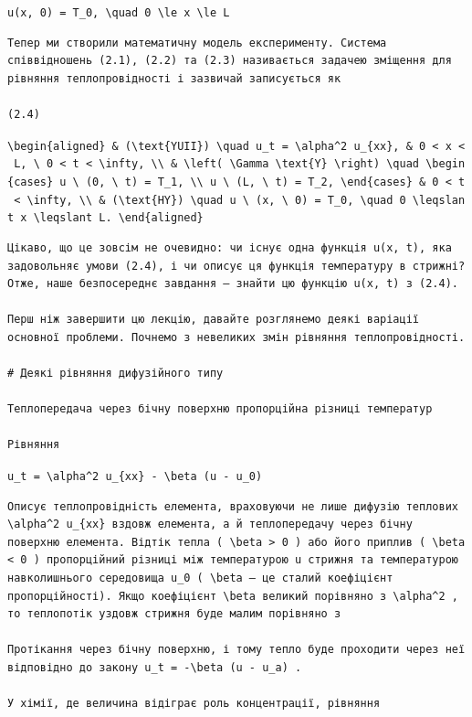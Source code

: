 \documentclass[
  ukrainian,
]{article}
\begin{document}
\texttt{u(x,\ 0)\ =\ T\_0,\ \textbackslash{}quad\ 0\ \textbackslash{}le\ x\ \textbackslash{}le\ L}

\begin{verbatim}
Тепер ми створили математичну модель експерименту. Система співвідношень (2.1), (2.2) та (2.3) називається задачею зміщення для рівняння теплопровідності і зазвичай записується як

(2.4)
\end{verbatim}

\texttt{\textbackslash{}begin\{aligned\}\ \&\ (\textbackslash{}text\{YUII\})\ \textbackslash{}quad\ u\_t\ =\ \textbackslash{}alpha\^{}2\ u\_\{xx\},\ \&\ 0\ \textless{}\ x\ \textless{}\ L,\ \textbackslash{}\ 0\ \textless{}\ t\ \textless{}\ \textbackslash{}infty,\ \textbackslash{}\textbackslash{}\ \&\ \textbackslash{}left(\ \textbackslash{}Gamma\ \textbackslash{}text\{Y\}\ \textbackslash{}right)\ \textbackslash{}quad\ \textbackslash{}begin\{cases\}\ u\ \textbackslash{}\ (0,\ \textbackslash{}\ t)\ =\ T\_1,\ \textbackslash{}\textbackslash{}\ u\ \textbackslash{}\ (L,\ \textbackslash{}\ t)\ =\ T\_2,\ \textbackslash{}end\{cases\}\ \&\ 0\ \textless{}\ t\ \textless{}\ \textbackslash{}infty,\ \textbackslash{}\textbackslash{}\ \&\ (\textbackslash{}text\{HY\})\ \textbackslash{}quad\ u\ \textbackslash{}\ (x,\ \textbackslash{}\ 0)\ =\ T\_0,\ \textbackslash{}quad\ 0\ \textbackslash{}leqslant\ x\ \textbackslash{}leqslant\ L.\ \textbackslash{}end\{aligned\}}

\begin{verbatim}
Цікаво, що це зовсім не очевидно: чи існує одна функція u(x, t), яка задовольняє умови (2.4), і чи описує ця функція температуру в стрижні? Отже, наше безпосереднє завдання — знайти цю функцію u(x, t) з (2.4).

Перш ніж завершити цю лекцію, давайте розглянемо деякі варіації основної проблеми. Почнемо з невеликих змін рівняння теплопровідності.

# Деякі рівняння дифузійного типу

Теплопередача через бічну поверхню пропорційна різниці температур

Рівняння
\end{verbatim}

\texttt{u\_t\ =\ \textbackslash{}alpha\^{}2\ u\_\{xx\}\ -\ \textbackslash{}beta\ (u\ -\ u\_0)}

\begin{verbatim}
Описує теплопровідність елемента, враховуючи не лише дифузію теплових \alpha^2 u_{xx} вздовж елемента, а й теплопередачу через бічну поверхню елемента. Відтік тепла ( \beta > 0 ) або його приплив ( \beta < 0 ) пропорційний різниці між температурою u стрижня та температурою навколишнього середовища u_0 ( \beta — це сталий коефіцієнт пропорційності). Якщо коефіцієнт \beta великий порівняно з \alpha^2 , то теплопотік уздовж стрижня буде малим порівняно з

Протікання через бічну поверхню, і тому тепло буде проходити через неї відповідно до закону u_t = -\beta (u - u_a) .

У хімії, де величина відіграє роль концентрації, рівняння
\end{verbatim}
\end{document}
